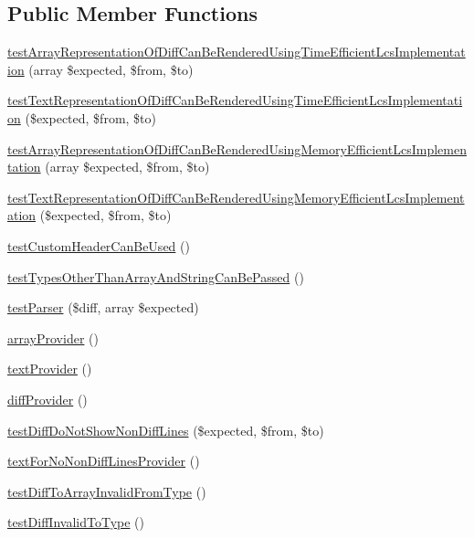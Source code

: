 \subsection*{Public Member Functions}
\begin{DoxyCompactItemize}
\item 
\mbox{\hyperlink{class_sebastian_bergmann_1_1_diff_1_1_differ_test_a230150b4e0180e10a0a7f514ef4ba3e6}{test\+Array\+Representation\+Of\+Diff\+Can\+Be\+Rendered\+Using\+Time\+Efficient\+Lcs\+Implementation}} (array \$expected, \$from, \$to)
\item 
\mbox{\hyperlink{class_sebastian_bergmann_1_1_diff_1_1_differ_test_a1557d31609f72e70a167e17078b53afd}{test\+Text\+Representation\+Of\+Diff\+Can\+Be\+Rendered\+Using\+Time\+Efficient\+Lcs\+Implementation}} (\$expected, \$from, \$to)
\item 
\mbox{\hyperlink{class_sebastian_bergmann_1_1_diff_1_1_differ_test_a03a66ecc135f53cbb7501296f3d35d7a}{test\+Array\+Representation\+Of\+Diff\+Can\+Be\+Rendered\+Using\+Memory\+Efficient\+Lcs\+Implementation}} (array \$expected, \$from, \$to)
\item 
\mbox{\hyperlink{class_sebastian_bergmann_1_1_diff_1_1_differ_test_afe640d834ba92bded9ae5e4d06d46ceb}{test\+Text\+Representation\+Of\+Diff\+Can\+Be\+Rendered\+Using\+Memory\+Efficient\+Lcs\+Implementation}} (\$expected, \$from, \$to)
\item 
\mbox{\hyperlink{class_sebastian_bergmann_1_1_diff_1_1_differ_test_ac21b0081d4a01799ec0c0bda771fa460}{test\+Custom\+Header\+Can\+Be\+Used}} ()
\item 
\mbox{\hyperlink{class_sebastian_bergmann_1_1_diff_1_1_differ_test_a70b9b4b2edddf14d7d858214775a9758}{test\+Types\+Other\+Than\+Array\+And\+String\+Can\+Be\+Passed}} ()
\item 
\mbox{\hyperlink{class_sebastian_bergmann_1_1_diff_1_1_differ_test_a9fa6ccfceee9342544a046db0aee3fa0}{test\+Parser}} (\$diff, array \$expected)
\item 
\mbox{\hyperlink{class_sebastian_bergmann_1_1_diff_1_1_differ_test_a119710504ca0e9909a2e5ad35ca148de}{array\+Provider}} ()
\item 
\mbox{\hyperlink{class_sebastian_bergmann_1_1_diff_1_1_differ_test_aa38000afff04ae9eef1e3c1c980d427c}{text\+Provider}} ()
\item 
\mbox{\hyperlink{class_sebastian_bergmann_1_1_diff_1_1_differ_test_a970b6214b8f4b8257d92b371df92d372}{diff\+Provider}} ()
\item 
\mbox{\hyperlink{class_sebastian_bergmann_1_1_diff_1_1_differ_test_afc6d8de33727401ad40022b6475c6ab0}{test\+Diff\+Do\+Not\+Show\+Non\+Diff\+Lines}} (\$expected, \$from, \$to)
\item 
\mbox{\hyperlink{class_sebastian_bergmann_1_1_diff_1_1_differ_test_a13033fefeaa1795cd9e68a52bc2207f5}{text\+For\+No\+Non\+Diff\+Lines\+Provider}} ()
\item 
\mbox{\hyperlink{class_sebastian_bergmann_1_1_diff_1_1_differ_test_a52eecf39e44165bf98b68e8fc2d6a305}{test\+Diff\+To\+Array\+Invalid\+From\+Type}} ()
\item 
\mbox{\hyperlink{class_sebastian_bergmann_1_1_diff_1_1_differ_test_a087f435ba41a3073e6351b677b252d6e}{test\+Diff\+Invalid\+To\+Type}} ()
\end{DoxyCompactItemize}

